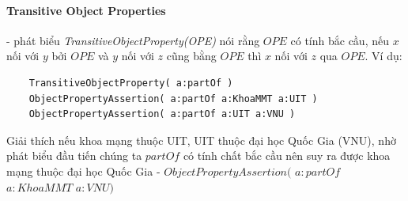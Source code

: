 \paragraph{Transitive Object Properties} - phát biểu \textit{TransitiveObjectProperty(OPE)} nói rằng $OPE$ có tính bắc cầu, nếu $x$ nối với $y$ bởi $OPE$ và $y$ nối với $z$ cũng bằng $OPE$ thì $x$ nối với $z$ qua $OPE$. Ví dụ:
\begin{verbatim}
	TransitiveObjectProperty( a:partOf ) 
	ObjectPropertyAssertion( a:partOf a:KhoaMMT a:UIT )
	ObjectPropertyAssertion( a:partOf a:UIT a:VNU )
\end{verbatim}
Giải thích nếu khoa mạng thuộc UIT, UIT thuộc đại học Quốc Gia (VNU), nhờ phát biểu đầu tiến chúng ta $partOf$ có tính chất bắc cầu nên suy ra được khoa mạng thuộc đại học Quốc Gia - $ObjectPropertyAssertion($ $a:partOf$ $a:KhoaMMT$ $a:VNU)$








